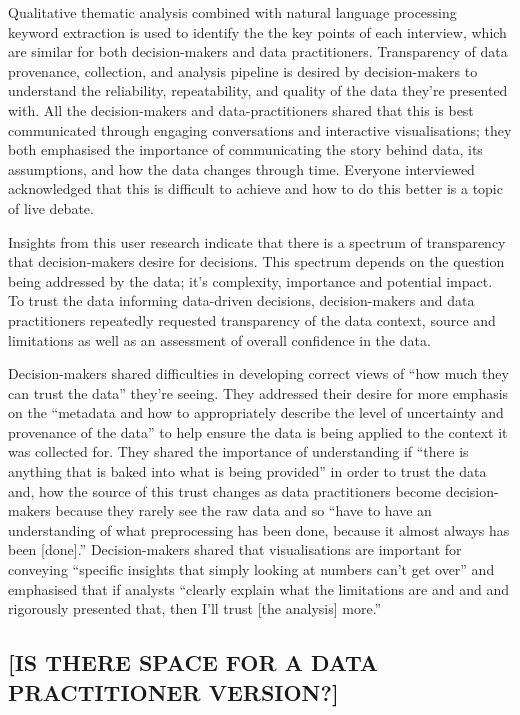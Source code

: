 \documentclass{article}
\begin{document}
Qualitative thematic analysis combined with natural language processing
keyword extraction is used to identify the the key points of each
interview, which are similar for both decision-makers and data
practitioners. Transparency of data provenance, collection, and analysis
pipeline is desired by decision-makers to understand the reliability,
repeatability, and quality of the data they're presented with. All the
decision-makers and data-practitioners shared that this is best
communicated through engaging conversations and interactive
visualisations; they both emphasised the importance of communicating the
story behind data, its assumptions, and how the data changes through
time. Everyone interviewed acknowledged that this is difficult to
achieve and how to do this better is a topic of live debate.

Insights from this user research indicate that there is a spectrum of
transparency that decision-makers desire for decisions. This spectrum
depends on the question being addressed by the data; it's complexity,
importance and potential impact. To trust the data informing data-driven
decisions, decision-makers and data practitioners repeatedly requested
transparency of the data context, source and limitations as well as an
assessment of overall confidence in the data.

Decision-makers shared difficulties in developing correct views of ``how
much they can trust the data'' they're seeing. They addressed their
desire for more emphasis on the ``metadata and how to appropriately
describe the level of uncertainty and provenance of the data'' to help
ensure the data is being applied to the context it was collected for.
They shared the importance of understanding if ``there is anything that
is baked into what is being provided'' in order to trust the data and,
how the source of this trust changes as data practitioners become
decision-makers because they rarely see the raw data and so ``have to
have an understanding of what preprocessing has been done, because it
almost always has been {[}done{]}.'' Decision-makers shared that
visualisations are important for conveying ``specific insights that
simply looking at numbers can't get over'' and emphasised that if
analysts ``clearly explain what the limitations are and and and
rigorously presented that, then I'll trust {[}the analysis{]} more.''

\hypertarget{is-there-space-for-a-data-practitioner-version}{%
\subsection{{[}IS THERE SPACE FOR A DATA PRACTITIONER
VERSION?{]}}\label{is-there-space-for-a-data-practitioner-version}}
\end{document}

